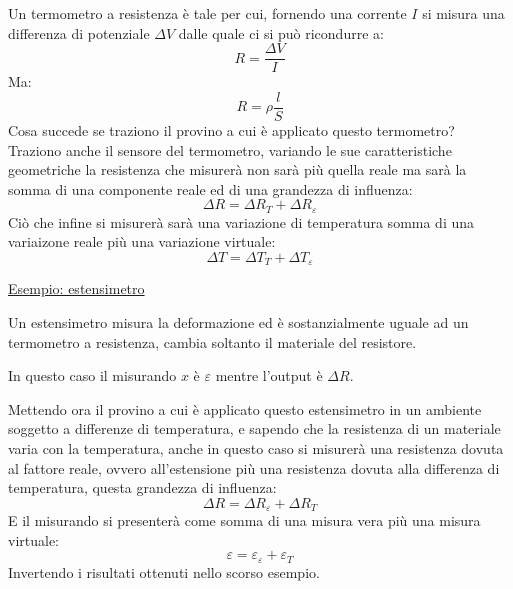 \documentclass[a4paper, 15pt]{article}
\begin{document}
\begin{adjustwidth}{2in}{}
	Un termometro a resistenza è tale per cui, fornendo una corrente $ I  $ si misura una differenza di potenziale $ \Delta V $ dalle quale ci si può ricondurre a:
	\[ R=\dfrac{\Delta V}{I}\]
	Ma:
	\[ R = \rho \dfrac{l}{S}\]
	Cosa succede se traziono il provino a cui è applicato questo termometro? Traziono anche il sensore del termometro, variando le sue caratteristiche geometriche la resistenza che misurerà non sarà più quella reale ma sarà la somma di una componente reale ed di una grandezza di  influenza:
	\[\Delta R = \Delta R_T + \Delta R_\varepsilon\]
	Ciò che infine si misurerà sarà una variazione di temperatura somma di una variaizone reale più una variazione virtuale:
	\[\Delta T = \Delta T_T + \Delta T_\varepsilon \]
	
	\underline{Esempio: estensimetro} 
	
	Un estensimetro misura la deformazione ed è sostanzialmente uguale ad un termometro a resistenza, cambia soltanto il materiale del resistore. 
	
	In questo caso il misurando $x$ è $\varepsilon$ mentre l'output è $\Delta R$. 
	
	Mettendo ora il provino a cui è applicato questo estensimetro in un ambiente soggetto a differenze di temperatura, e sapendo che la resistenza di un materiale varia con la temperatura, anche in questo caso si misurerà una resistenza dovuta al fattore reale, ovvero all'estensione più una resistenza dovuta alla differenza di temperatura, questa grandezza di influenza:
	\[\Delta R = \Delta R_\varepsilon + \Delta R_T  \] 
	E il misurando si presenterà come somma di una misura vera più una misura virtuale: 
	\[ \varepsilon = \varepsilon_\varepsilon + \varepsilon_T\]
	Invertendo i risultati ottenuti nello scorso esempio.
	\end{adjustwidth} 
	 
\newpage
	
\end{document}
